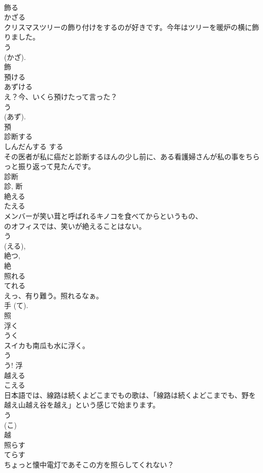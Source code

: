 \documentclass[8pt]{extreport}
\begin{document}
\begin{CJK}{UTF8}{min}
\\	飾る	
\\	かざる	
\\	クリスマスツリーの飾り付けをするのが好きです。今年はツリーを暖炉の横に飾りました。	
\\	う 
\\	(かざ). 
\\	飾	
\\	預ける	
\\	あずける	
\\	え？今、いくら預けたって言った？	
\\	う 
\\	(あず). 
\\	預	
\\	診断する	
\\	しんだんする	する 
\\	その医者が私に癌だと診断するほんの少し前に、ある看護婦さんが私の事をちらっと振り返って見たんです。	
\\	診断 
\\	診, 断	
\\	絶える	
\\	たえる	
\\	メンバーが笑い茸と呼ばれるキノコを食べてからというもの、
\\	のオフィスでは、笑いが絶えることはない。	
\\	う 
\\	(える), 
\\	絶つ, 
\\	絶	
\\	照れる	
\\	てれる	
\\	えっ、有り難う。照れるなぁ。	
\\	手 (て). 
\\	照	
\\	浮く	
\\	うく	
\\	スイカも南瓜も水に浮く。	
\\	う 
\\	う!	浮	
\\	越える	
\\	こえる	
\\	日本語では、線路は続くよどこまでもの歌は、「線路は続くよどこまでも、野を越え山越え谷を越え」という感じで始まります。	
\\	う 
\\	(こ) 
\\	越	
\\	照らす	
\\	てらす	
\\	ちょっと懐中電灯であそこの方を照らしてくれない？	

\end{CJK}
\end{document}
